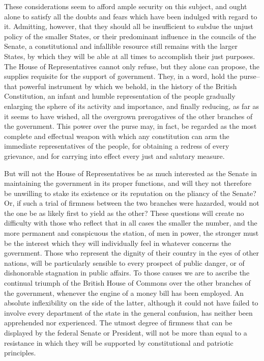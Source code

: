 These considerations seem to afford ample security on this subject, and ought alone to satisfy all the doubts and fears which have been indulged with regard to it. 
Admitting, however, that they should all be insufficient to subdue the unjust policy of the smaller States, or their predominant influence in the councils of the Senate, a constitutional and infallible resource still remains with the larger States, by which they will be able at all times to accomplish their just purposes. 
The House of Representatives cannot only refuse, but they alone can propose, the supplies requisite for the support of government. 
They, in a word, hold the purse--that powerful instrument by which we behold, in the history of the British Constitution, an infant and humble representation of the people gradually enlarging the sphere of its activity and importance, and finally reducing, as far as it seems to have wished, all the overgrown prerogatives of the other branches of the government. 
This power over the purse may, in fact, be regarded as the most complete and effectual weapon with which any constitution can arm the immediate representatives of the people, for obtaining a redress of every grievance, and for carrying into effect every just and salutary measure.

But will not the House of Representatives be as much interested as the Senate in maintaining the government in its proper functions, and will they not therefore be unwilling to stake its existence or its reputation on the pliancy of the Senate? 
Or, if such a trial of firmness between the two branches were hazarded, would not the one be as likely first to yield as the other? 
These questions will create no difficulty with those who reflect that in all cases the smaller the number, and the more permanent and conspicuous the station, of men in power, the stronger must be the interest which they will individually feel in whatever concerns the government. 
Those who represent the dignity of their country in the eyes of other nations, will be particularly sensible to every prospect of public danger, or of dishonorable stagnation in public affairs. 
To those causes we are to ascribe the continual triumph of the British House of Commons over the other branches of the government, whenever the engine of a money bill has been employed. 
An absolute inflexibility on the side of the latter, although it could not have failed to involve every department of the state in the general confusion, has neither been apprehended nor experienced. 
The utmost degree of firmness that can be displayed by the federal Senate or President, will not be more than equal to a resistance in which they will be supported by constitutional and patriotic principles.

